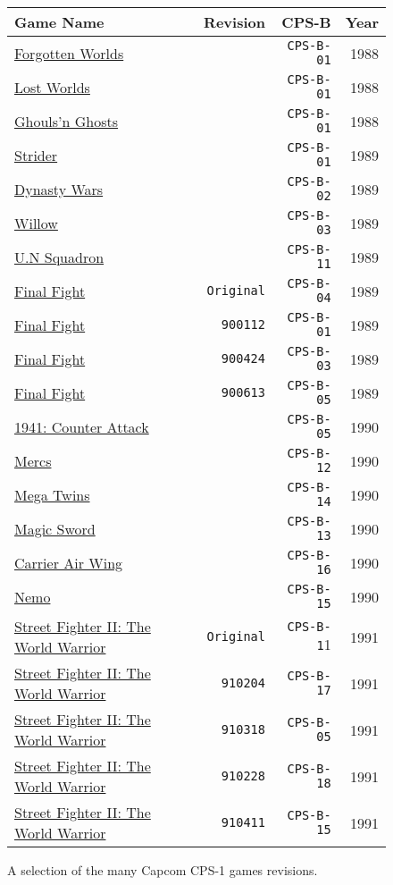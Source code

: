 \begin{figure}[H]
{ \setlength{\tabcolsep}{3.0pt}
\begin{tabularx}{\textwidth}{Xrrr} 
  \textbf{Game Name} & \textbf{Revision} & \textbf{ CPS-B }  & \textbf{ Year } \\               
  \toprule    
\href{}{Forgotten Worlds} & & \texttt{CPS-B-01} & 1988 \\ 
\href{}{Lost Worlds} & & \texttt{CPS-B-01} & 1988 \\ 
\href{}{Ghouls'n Ghosts} & & \texttt{CPS-B-01} & 1988 \\ 
  \toprule    
\href{}{Strider} & & \texttt{CPS-B-01} & 1989 \\ 
\href{}{Dynasty Wars} & & \texttt{CPS-B-02} & 1989 \\ 
\href{}{Willow} & & \texttt{CPS-B-03} & 1989 \\ 
\href{}{U.N Squadron} & & \texttt{CPS-B-11}   & 1989 \\ 

\href{}{Final Fight } & \texttt{Original} & \texttt{CPS-B-04} & 1989 \\ %
\href{}{Final Fight } & \texttt{900112}& \texttt{CPS-B-01} & 1989 \\ %
\href{}{Final Fight } & \texttt{900424}& \texttt{CPS-B-03} & 1989 \\ %
\href{}{Final Fight } & \texttt{900613}& \texttt{CPS-B-05} & 1989 \\ %

  \toprule    
\href{}{1941: Counter Attack} & & \texttt{CPS-B-05} &  1990 \\ 
\href{}{Mercs} & &  \texttt{CPS-B-12} & 1990 \\ 
\href{}{Mega Twins} & & \texttt{CPS-B-14} & 1990 \\ 
\href{}{Magic Sword} & & \texttt{CPS-B-13} & 1990 \\ 
\href{}{Carrier Air Wing} & & \texttt{CPS-B-16}  & 1990 \\ 
\href{}{Nemo} & & \texttt{CPS-B-15} &  1990 \\ 
  \toprule    
\href{}{Street Fighter II: The World Warrior }&  \texttt{Original}& \texttt{CPS-B-1}1 & 1991 \\  %
\href{}{Street Fighter II: The World Warrior } & \texttt{910204}& \texttt{CPS-B-17} & 1991 \\  %
\href{}{Street Fighter II: The World Warrior } & \texttt{910318}& \texttt{CPS-B-05} & 1991 \\  %
\href{}{Street Fighter II: The World Warrior } & \texttt{910228}& \texttt{CPS-B-18} & 1991 \\  %
\href{}{Street Fighter II: The World Warrior } & \texttt{910411}& \texttt{CPS-B-15} & 1991 \\  %
\toprule    
\end{tabularx}%
}\caption*{A selection of the many Capcom CPS-1 games revisions.}
\end{figure}

